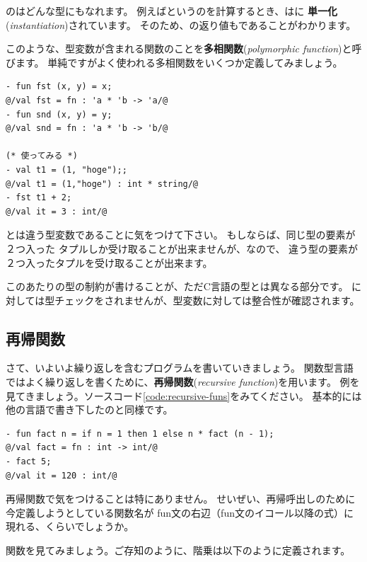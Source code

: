 \documentclass[11pt,a4paper]{article}
\begin{document}
のはどんな型にもなれます。
例えばというのを計算するとき、はに
{\bfseries 単一化}({\itshape instantiation})されています。
そのため、の返り値もであることがわかります。

このような、型変数が含まれる関数のことを{\bfseries 多相関数}({\itshape polymorphic function})と呼びます。
単純ですがよく使われる多相関数をいくつか定義してみましょう。

\begin{lstlisting}[caption=多相関数たち,label=code:poly]
- fun fst (x, y) = x;
@/val fst = fn : 'a * 'b -> 'a/@
- fun snd (x, y) = y;
@/val snd = fn : 'a * 'b -> 'b/@

(* 使ってみる *)
- val t1 = (1, "hoge");;
@/val t1 = (1,"hoge") : int * string/@
- fst t1 + 2;
@/val it = 3 : int/@
\end{lstlisting}

とは違う型変数であることに気をつけて下さい。
もしならば、同じ型の要素が２つ入った
タプルしか受け取ることが出来ませんが、なので、
違う型の要素が２つ入ったタプルを受け取ることが出来ます。

このあたりの型の制約が書けることが、ただC言語の型とは異なる部分です。
に対しては型チェックをされませんが、型変数に対しては整合性が確認されます。

\subsection{再帰関数}

さて、いよいよ繰り返しを含むプログラムを書いていきましょう。
関数型言語ではよく繰り返しを書くために、{\bfseries 再帰関数}({\itshape recursive function})を用います。
例を見てきましょう。ソースコード\ref{code:recursive-funs}をみてください。
基本的には他の言語で書き下したのと同様です。

\begin{lstlisting}[caption=再帰関数,label=code:recursive-funs]
- fun fact n = if n = 1 then 1 else n * fact (n - 1);
@/val fact = fn : int -> int/@
- fact 5;
@/val it = 120 : int/@
\end{lstlisting}

再帰関数で気をつけることは特にありません。
せいぜい、再帰呼出しのために今定義しようとしている関数名が
fun文の右辺（fun文のイコール以降の式）に現れる、くらいでしょうか。

関数を見てみましょう。ご存知のように、階乗は以下のように定義されます。
\end{document}
